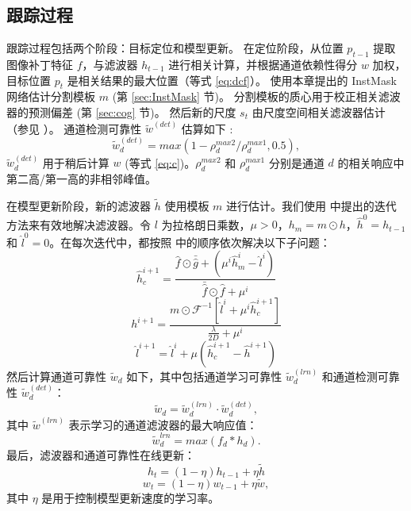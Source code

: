 \subsection{跟踪过程}
跟踪过程包括两个阶段：目标定位和模型更新。
在定位阶段，从位置 $p_{t-1}$ 提取图像补丁特征 $f$，与滤波器 $h_{t-1}$ 进行相关计算，并根据通道依赖性得分 $w$ 加权，目标位置 $p_t$ 是相关结果的最大位置（等式 \ref{eq:dcf}）。
使用本章提出的 InstMask 网络估计分割模板 $m$ (第 \ref{sec:InstMask} 节)。
分割模板的质心用于校正相关滤波器的预测偏差 (第 \ref{sec:cog} 节)。
然后新的尺度 $s_t$ 由尺度空间相关滤波器估计（参见 \cite{Danelljan2014AccurateSE}）。
通道检测可靠性 $\tilde{w}^{(det)}$ 估算如下 \cite{Lukezic2017DiscriminativeCF}:
\begin{equation} \label{eq:det}
\tilde w_d^{(det)} = max(1 - \rho_d^{max2} / \rho_d^{max1}, 0.5),
\end{equation}
$\tilde w_d^{(det)}$ 用于稍后计算 $w$ (等式 \ref{eq:c})。$\rho_d^{max2}$ 和 $\rho_d^{max1}$ 分别是通道 $d$ 的相关响应中第二高/第一高的非相邻峰值。

在模型更新阶段，新的滤波器 $\tilde{h}$ 使用模板 $m$ 进行估计。我们使用 \cite{Lukezic2017DiscriminativeCF} 中提出的迭代方法来有效地解决滤波器。令 $l$ 为拉格朗日乘数，$\mu > 0$，$h_m=m \odot h$，$\hat{h}^0 = h_{t-1}$ 和 $\hat{l}^0 = 0$。在每次迭代中，都按照 \cite{Lukezic2017DiscriminativeCF} 中的顺序依次解决以下子问题：
\begin{equation} \label{eq:h1}
\hat{h}_c^{i+1} = \frac{\hat{f} \odot \bar{\hat{g}} +(\mu^i \hat{h}_m^i - \hat{l}^i)}{\bar{\hat{f}} \odot \hat f + \mu^i}
\end{equation}
\begin{equation}
h^{i+1} = \frac{m \odot \mathcal{F}^{-1}[\hat{l}^i + \mu^i\hat{h}_c^{i+1}]}{\frac{\lambda}{2D} + \mu^i}
\end{equation}
\begin{equation} \label{eq:h3}
\hat{l}^{i+1} = \hat{l}^i + \mu(\hat{h}_c^{i+1} - \hat{h}^{i+1})
\end{equation}
然后计算通道可靠性 $\tilde w_d$ \cite{Lukezic2017DiscriminativeCF} 如下，其中包括通道学习可靠性 $\tilde w_d^{(lrn)}$ 和通道检测可靠性 $\tilde w_d^{(det)}$：
\begin{equation} \label{eq:c}
\tilde w_d = \tilde w_d^{(lrn)} \cdot \tilde w_d^{(det)},
\end{equation}
其中 $\tilde{w}^{(lrn)}$ 表示学习的通道滤波器的最大响应值：
\begin{equation} \label{eq:lrn}
\tilde{w}_d^{lrn} = max(f_d * h_d).
\end{equation}
最后，滤波器和通道可靠性在线更新：\begin{equation} \label{eq:update1}
h_t = (1 - \eta)h_{t-1} + \eta \tilde{h}
\end{equation}
\begin{equation} \label{eq:update2}
w_t = (1-\eta)w_{t-1} + \eta \tilde{w},
\end{equation}
其中 $\eta$ 是用于控制模型更新速度的学习率。

